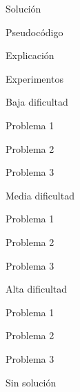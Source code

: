 \documentclass[
  spanish,
  ignorenonframetext,
]{beamer}
\begin{document}
\begin{frame}{Solución}
\protect\hypertarget{soluciuxf3n}{}
\begin{block}{Pseudocódigo}
\protect\hypertarget{pseudocuxf3digo}{}
\end{block}

\begin{block}{Explicación}
\protect\hypertarget{explicaciuxf3n}{}
\end{block}
\end{frame}

\begin{frame}{Experimentos}
\protect\hypertarget{experimentos}{}
\begin{block}{Baja dificultad}
\protect\hypertarget{baja-dificultad}{}
\begin{block}{Problema 1}
\protect\hypertarget{problema-1}{}
\end{block}

\begin{block}{Problema 2}
\protect\hypertarget{problema-2}{}
\end{block}

\begin{block}{Problema 3}
\protect\hypertarget{problema-3}{}
\end{block}
\end{block}

\begin{block}{Media dificultad}
\protect\hypertarget{media-dificultad}{}
\begin{block}{Problema 1}
\protect\hypertarget{problema-1-1}{}
\end{block}

\begin{block}{Problema 2}
\protect\hypertarget{problema-2-1}{}
\end{block}

\begin{block}{Problema 3}
\protect\hypertarget{problema-3-1}{}
\end{block}
\end{block}

\begin{block}{Alta dificultad}
\protect\hypertarget{alta-dificultad}{}
\begin{block}{Problema 1}
\protect\hypertarget{problema-1-2}{}
\end{block}

\begin{block}{Problema 2}
\protect\hypertarget{problema-2-2}{}
\end{block}

\begin{block}{Problema 3}
\protect\hypertarget{problema-3-2}{}
\end{block}
\end{block}

\begin{block}{Sin solución}
\protect\hypertarget{sin-soluciuxf3n}{}
\end{block}
\end{frame}
\end{document}
